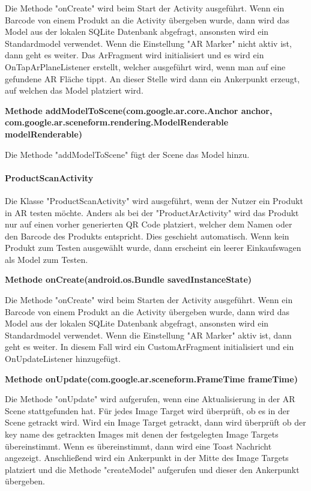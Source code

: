 \documentclass{scrartcl}
\begin{document}
\noindent Die Methode "onCreate" wird beim Start der Activity ausgeführt. Wenn ein Barcode von einem Produkt an die Activity übergeben wurde, dann wird das Model aus der lokalen SQLite Datenbank abgefragt, ansonsten wird ein Standardmodel verwendet. Wenn die Einstellung "AR Marker" nicht aktiv ist, dann geht es weiter. Das ArFragment wird initialisiert und es wird ein OnTapArPlaneListener erstellt, welcher ausgeführt wird, wenn man auf eine gefundene AR Fläche tippt. An dieser Stelle wird dann ein Ankerpunkt erzeugt, auf welchen das Model platziert wird.\newline

\noindent\textbf{Methode addModelToScene(com.google.ar.core.Anchor anchor, \newline com.google.ar.sceneform.rendering.ModelRenderable modelRenderable)} 

\noindent Die Methode "addModelToScene" fügt der Scene das Model hinzu. \newline 



\paragraph{ProductScanActivity} Die Klasse "ProductScanActivity" wird ausgeführt, wenn der Nutzer ein Produkt in AR testen möchte. Anders als bei der "ProductArActivity" wird das Produkt nur auf einen vorher generierten QR Code platziert, welcher dem Namen oder den Barcode des Produkts entspricht. Dies geschieht automatisch. Wenn kein Produkt zum Testen ausgewählt wurde, dann erscheint ein leerer Einkaufswagen als Model zum Testen. \newline

\noindent\textbf{Methode onCreate(android.os.Bundle savedInstanceState)}

\noindent Die Methode "onCreate" wird beim Starten der Activity ausgeführt. Wenn ein Barcode von einem Produkt an die Activity übergeben wurde, dann wird das Model aus der lokalen SQLite Datenbank abgefragt, ansonsten wird ein Standardmodel verwendet. Wenn die Einstellung "AR Marker" aktiv ist, dann geht es weiter. In diesem Fall wird ein CustomArFragment initialisiert und ein OnUpdateListener hinzugefügt. \newline

\noindent\textbf{Methode onUpdate(com.google.ar.sceneform.FrameTime frameTime)}

\noindent Die Methode "onUpdate" wird aufgerufen, wenn eine Aktualisierung in der AR Scene stattgefunden hat. Für jedes Image Target wird überprüft, ob es in der Scene getrackt wird. Wird ein Image Target getrackt, dann wird überprüft ob der key name des getrackten Images mit denen der festgelegten Image Targets übereinstimmt. Wenn es übereinstimmt, dann wird eine Toast Nachricht angezeigt. Anschließend wird ein Ankerpunkt in der Mitte des Image Targets platziert und die Methode "createModel" aufgerufen und dieser den Ankerpunkt übergeben. \newline
\end{document}
